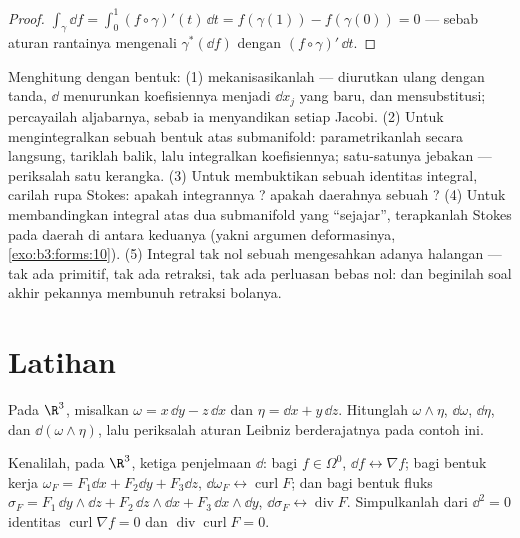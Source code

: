 \begin{proof}
$\int_\gamma\dd f = \int_0^1(f\circ\gamma)'(t)\,\dd t =
f(\gamma(1)) - f(\gamma(0)) = 0$ --- sebab aturan rantainya
mengenali $\gamma^*(\dd f)$ dengan $(f\circ\gamma)'\,\dd t$.
\end{proof}

\begin{method}\label{met:b3:forms:method}
Menghitung dengan bentuk: (1) mekanisasikanlah --- 
diurutkan ulang dengan tanda, $\dd$ menurunkan koefisiennya menjadi $\dd
x_j$ yang baru, dan  mensubstitusi; percayailah aljabarnya, sebab ia menyandikan
setiap Jacobi. (2) Untuk mengintegralkan sebuah bentuk atas submanifold:
parametrikanlah secara langsung, tariklah balik, lalu integralkan koefisiennya;
 satu-satunya jebakan --- periksalah satu kerangka. (3) Untuk
membuktikan sebuah identitas integral, carilah rupa Stokes: apakah
integrannya ? apakah daerahnya sebuah ? (4) Untuk membandingkan
integral atas dua submanifold yang ``sejajar'', terapkanlah Stokes
pada daerah di antara keduanya (yakni argumen deformasinya,
\cref{exo:b3:forms:10}). (5) Integral tak nol sebuah  mengesahkan adanya halangan  --- tak ada primitif,
tak ada retraksi, tak ada perluasan bebas nol: dan beginilah
soal akhir pekannya membunuh retraksi bolanya.
\end{method}

\section{Latihan}

\begin{exercise}[$\star$]\label{exo:b3:forms:1}
Pada $\R^3$, misalkan $\omega = x\,\dd y - z\,\dd x$ dan $\eta =
\dd x + y\,\dd z$. Hitunglah $\omega\wedge\eta$, $\dd\omega$,
$\dd\eta$, dan $\dd(\omega\wedge\eta)$, lalu periksalah
aturan Leibniz berderajatnya pada contoh ini.
\end{exercise}

\begin{exercise}[$\star$]\label{exo:b3:forms:2}
Kenalilah, pada $\R^3$, ketiga penjelmaan $\dd$: bagi
$f \in \Omega^0$, $\dd f \leftrightarrow \nabla f$; bagi
bentuk kerja $\omega_F = F_1\dd x + F_2\dd y + F_3\dd z$,
$\dd\omega_F \leftrightarrow \operatorname{curl}F$; dan bagi
bentuk fluks $\sigma_F = F_1\,\dd y\wedge\dd z + F_2\,\dd
z\wedge\dd x + F_3\,\dd x\wedge\dd y$, $\dd\sigma_F
\leftrightarrow \operatorname{div}F$. Simpulkanlah dari $\dd^2 =
0$ identitas $\operatorname{curl}\nabla f = 0$ dan
$\operatorname{div}\operatorname{curl}F = 0$.
\end{exercise}

